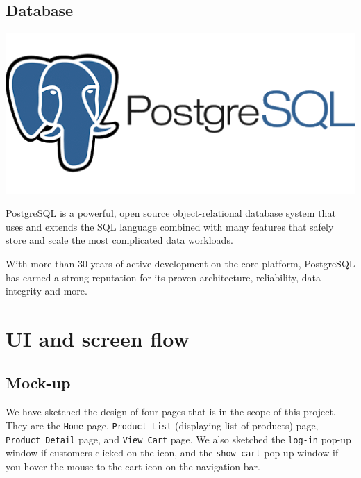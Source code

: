 \documentclass[a4paper]{article}
\numberwithin{equation}{section}
\begin{document}
\subsection{Database}
\includegraphics[width=\textwidth]{assets/postgresql-logo.png}

PostgreSQL is a powerful, open source object-relational database system that uses and extends the SQL language combined with many features that safely store and scale the most complicated data workloads.

With more than 30 years of active development on the core platform, PostgreSQL has earned a strong reputation for its proven architecture, reliability, data integrity and more.

\newpage

\section{UI and screen flow}

\subsection{Mock-up}

We have sketched the design of four pages that is in the scope of this project.
They are the \texttt{Home} page, \texttt{Product List} (displaying list of products) page, \texttt{Product Detail} page, and \texttt{View Cart} page.
We also sketched the \texttt{log-in} pop-up window if customers clicked on the icon, and the \texttt{show-cart} pop-up window if you hover the mouse to the cart icon on the navigation bar.\\
\end{document}
